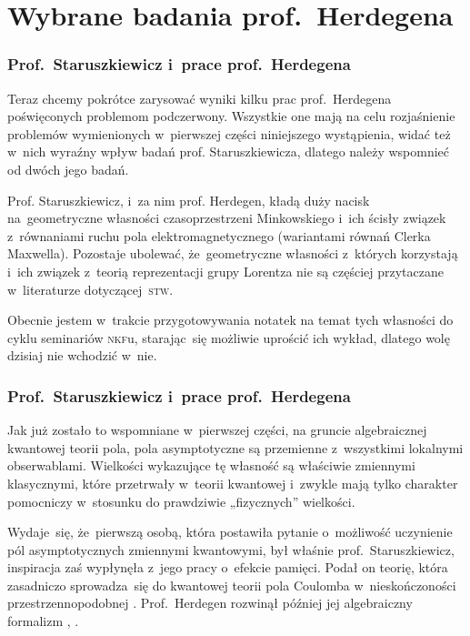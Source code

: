 \documentclass[10pt,t]{beamer}
\begin{document}
\section{Wybrane badania prof.~Herdegena}


\begin{frame}
  \frametitle{Prof.~Staruszkiewicz i~prace prof.~Herdegena}


  Teraz chcemy pokrótce zarysować wyniki kilku prac prof.~Herdegena
  poświęconych problemom podczerwony. Wszystkie one mają na celu
  rozjaśnienie problemów wymienionych w~pierwszej części niniejszego
  wystąpienia, widać też w~nich wyraźny wpływ badań prof. Staruszkiewicza,
  dlatego należy wspomnieć od dwóch jego badań.

  Prof. Staruszkiewicz, i~za nim prof. Herdegen, kładą duży nacisk
  na~geometryczne własności czasoprzestrzeni Minkowskiego i~ich ścisły
  związek z~równaniami ruchu pola elektromagnetycznego (wariantami równań
  Clerka Maxwella). Pozostaje ubolewać, że~geometryczne własności z~których
  korzystają i~ich związek z~teorią reprezentacji grupy Lorentza nie są
  częściej przytaczane w~literaturze dotyczącej~\textsc{stw}.

  Obecnie jestem w~trakcie przygotowywania notatek na temat tych własności
  do cyklu seminariów \textsc{nkf}u, starając~się możliwie uprościć ich
  wykład, dlatego wolę dzisiaj nie wchodzić w~nie.

\end{frame}





\begin{frame}
  \frametitle{Prof.~Staruszkiewicz i~prace prof.~Herdegena}


  Jak już zostało to wspomniane w~pierwszej części, na gruncie algebraicznej
  kwantowej teorii pola, pola asymptotyczne są przemienne z~wszystkimi
  lokalnymi obserwablami. Wielkości wykazujące tę własność są
  właściwie zmiennymi klasycznymi, które przetrwały w~teorii kwantowej
  i~zwykle mają tylko charakter pomocniczy w~stosunku do prawdziwie
  „fizycznych” wielkości.

  Wydaje~się, że~pierwszą osobą, która postawiła pytanie o~możliwość
  uczynienie pól asymptotycznych zmiennymi kwantowymi, był właśnie
  prof.~Staruszkiewicz, inspiracja zaś wypłynęła z~jego pracy o~efekcie
  pamięci. Podał on teorię, która zasadniczo sprowadza~się do kwantowej
  teorii pola Coulomba w~nieskończoności przestrzennopodobnej
  \parencite{Staruszkiewicz-Quantum-Mechanics-of-Phase-and-Charge-ETC-Pub-1989}.
  Prof.~Herdegen rozwinął później jej algebraiczny formalizm
  \parencite{Herdegen-Asymptotic-algebra-of-quantum-electrodynamics-Pub-2005},
  \parencite{Herdegen-Remarks-on-mathematical-structure-of-ETC-Pub-2022}.

\end{frame}
\end{document}
